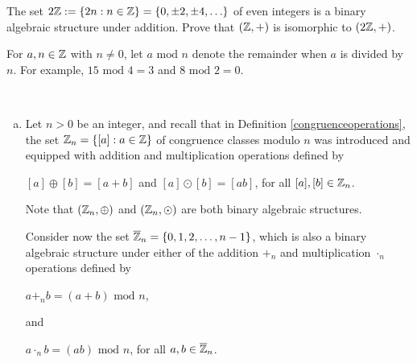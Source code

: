 \documentclass[11pt,fleqn,dvipsnames,usenames]{article}
\newcommand{\p}{\noindent}
\begin{document}
%
\begin{exercise}
The set $2\mathbb{Z} := \left\{2n:n\in\mathbb{Z}\right\} = \left\{0, \pm 2, \pm 4,\ldots\right\}$ of even integers is a binary algebraic structure under addition.  Prove that $(\mathbb{Z},+)$ is isomorphic to $(2\mathbb{Z},+)$.
\end{exercise}
%
\notation For $a,n\in\mathbb{Z}$ with $n\neq 0$, let $a\text{ mod }n$ denote the remainder when $a$ is divided by $n$.  For example, $15\text{ mod }4 = 3$ and $8\text{ mod }2 = 0$.
%
\begin{examples}~
\begin{enumerate}[(a)]
\item Let $n>0$ be an integer, and recall that in Definition \ref{congruenceoperations}, the set $\mathbb{Z}_{n} = \left\{[a]:a\in\mathbb{Z}\right\}$ of congruence classes modulo $n$ was introduced and equipped with addition and multiplication operations defined by
\begin{center}
$[a]\oplus [b] = [a + b]$ and $[a]\odot [b] = [ab]$, for all $[a],[b]\in\mathbb{Z}_{n}$.
\end{center}
\p Note that $(\mathbb{Z}_{n},\oplus)$ and $(\mathbb{Z}_{n},\odot)$ are both binary algebraic structures.
\vsp

\p Consider now the set $\overline{\mathbb{Z}}_{n} = \left\{0,1,2,\ldots, n-1\right\}$, which is also a binary algebraic structure under either of the addition $+_{n}$ and multiplication $\cdot_{n}$ operations defined by
\begin{center}
$a+_{n}b = (a + b)\text{ mod }n$,
\end{center}
and
\begin{center}
$a\cdot_{n}b = (ab)\text{ mod }n$, for all $a,b\in\overline{\mathbb{Z}}_{n}$.
\end{center}


\end{enumerate}
\end{examples}
\end{document}
